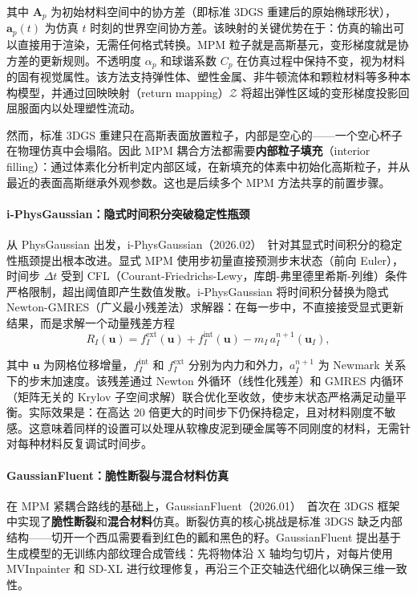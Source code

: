 其中 $\mathbf{A}_p$ 为初始材料空间中的协方差（即标准 3DGS 重建后的原始椭球形状），$\mathbf{a}_p(t)$ 为仿真 $t$ 时刻的世界空间协方差。该映射的关键优势在于：仿真的输出可以直接用于渲染，无需任何格式转换。MPM 粒子就是高斯基元，变形梯度就是协方差的更新规则。不透明度 $\alpha_p$ 和球谐系数 $C_p$ 在仿真过程中保持不变，视为材料的固有视觉属性。该方法支持弹性体、塑性金属、非牛顿流体和颗粒材料等多种本构模型，并通过回映映射（return mapping）$\mathcal{Z}$ 将超出弹性区域的变形梯度投影回屈服面内以处理塑性流动。

然而，标准 3DGS 重建只在高斯表面放置粒子，内部是空心的——一个空心杯子在物理仿真中会塌陷。因此 MPM 耦合方法都需要\textbf{内部粒子填充}（interior filling）：通过体素化分析判定内部区域，在新填充的体素中初始化高斯粒子，并从最近的表面高斯继承外观参数。这也是后续多个 MPM 方法共享的前置步骤。

\paragraph{i-PhysGaussian：隐式时间积分突破稳定性瓶颈}

从 PhysGaussian 出发，i-PhysGaussian（2026.02）~\cite{2602_17117}针对其显式时间积分的稳定性瓶颈提出根本改进。显式 MPM 使用步初量直接预测步末状态（前向 Euler），时间步 $\Delta t$ 受到 CFL（Courant-Friedrichs-Lewy，库朗-弗里德里希斯-列维）条件严格限制，超出阈值即产生数值发散。i-PhysGaussian 将时间积分替换为隐式 Newton-GMRES（广义最小残差法）求解器：在每一步中，不直接接受显式更新结果，而是求解一个动量残差方程
\begin{equation}
R_I(\mathbf{u}) = f_I^{\text{ext}}(\mathbf{u}) + f_I^{\text{int}}(\mathbf{u}) - m_I \, a_I^{n+1}(\mathbf{u}_I),
\end{equation}

其中 $\mathbf{u}$ 为网格位移增量，$f_I^{\text{int}}$ 和 $f_I^{\text{ext}}$ 分别为内力和外力，$a_I^{n+1}$ 为 Newmark 关系下的步末加速度。该残差通过 Newton 外循环（线性化残差）和 GMRES 内循环（矩阵无关的 Krylov 子空间求解）联合优化至收敛，使步末状态严格满足动量平衡。实际效果是：在高达 20 倍更大的时间步下仍保持稳定，且对材料刚度不敏感。这意味着同样的设置可以处理从软橡皮泥到硬金属等不同刚度的材料，无需针对每种材料反复调试时间步。

\paragraph{GaussianFluent：脆性断裂与混合材料仿真}

在 MPM 紧耦合路线的基础上，GaussianFluent（2026.01）~\cite{2601_09265}首次在 3DGS 框架中实现了\textbf{脆性断裂}和\textbf{混合材料}仿真。断裂仿真的核心挑战是标准 3DGS 缺乏内部结构——切开一个西瓜需要看到红色的瓤和黑色的籽。GaussianFluent 提出基于生成模型的无训练内部纹理合成管线：先将物体沿 X 轴均匀切片，对每片使用 MVInpainter 和 SD-XL 进行纹理修复，再沿三个正交轴迭代细化以确保三维一致性。

